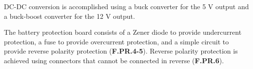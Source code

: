 DC-DC conversion is accomplished using a buck converter for the 5 V output and a buck-boost converter for the 12 V output. 

The battery protection board consists of a Zener diode to provide undercurrent protection, a fuse to provide overcurrent protection, and a simple circuit to provide reverse polarity protection (\textbf{F.PR.4-5}). Reverse polarity protection is achieved using connectors that cannot be connected in reverse (\textbf{F.PR.6}). 